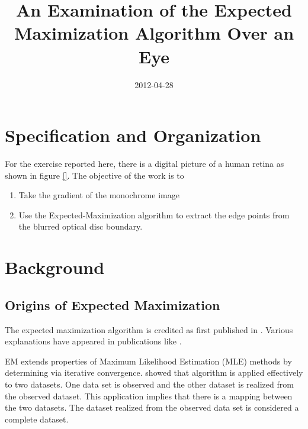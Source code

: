 \documentclass[]{article}
\title{An Examination of the Expected Maximization Algorithm Over an Eye}
\author{  }
\date{2012-04-28}
\begin{document}
\ifpdf
{}
\else
{}
\fi

\maketitle


\begin{abstract}
\end{abstract}

\section{Specification and Organization} %
\label{sec:specification}
For the exercise reported here, there is a digital picture of a human retina as shown in figure \ref{}.  The objective of the work is to 
\begin{enumerate}
	\item Take the gradient of the monochrome image
	\item Use the Expected-Maximization algorithm to extract the edge points from the blurred optical disc boundary.
\end{enumerate}



\section{Background} %
\label{sec:background}

\subsection{Origins of Expected Maximization} %
\label{sub:origins_of_expected_maximization}
The expected maximization algorithm is credited as first published in \cite{Dempster77maximumlikelihood}.  Various explanations have appeared in publications like \cite{duda-hart-stork,Moon96theexpectation-maximization, Joo_expectationmaximization}.    %

EM extends properties of Maximum Likelihood Estimation (MLE) methods by determining via iterative convergence.  %
\cite{Dempster77maximumlikelihood} showed that algorithm is applied effectively to two datasets.  One data set is observed and the other dataset is realized from the observed dataset.  This application implies that there is a mapping between the two datasets.   The dataset realized from the observed data set is considered a complete dataset.  
\end{document}
